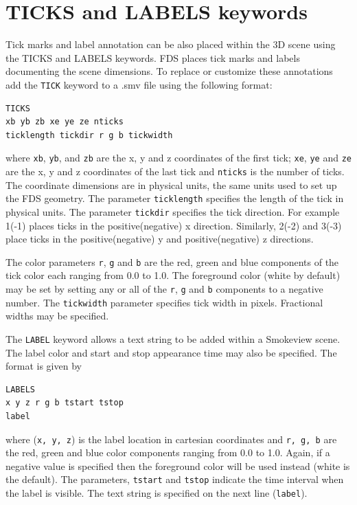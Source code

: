 \documentclass[11pt,twoside]{book}
\begin{document}
\section{TICKS and LABELS keywords}
Tick marks and label annotation
can be also placed within the 3D scene using the TICKS and LABELS keywords.
FDS places tick marks and labels
documenting the scene dimensions.  To replace or customize
these annotations add the {\tt TICK} keyword to a .smv file
using the following format:

\begin{verbatim}
TICKS
xb yb zb xe ye ze nticks
ticklength tickdir r g b tickwidth
\end{verbatim}

\noindent where {\tt xb}, {\tt yb}, and {\tt zb} are the x, y and
z coordinates of the first tick; {\tt xe}, {\tt ye} and {\tt ze}
are the x, y and z coordinates of the last tick and {\tt nticks}
is the number of ticks. The coordinate dimensions are in physical
units, the same units used to set up the FDS geometry. The
parameter {\tt ticklength} specifies the length of the tick in
physical units. The parameter {\tt tickdir} specifies the tick
direction.  For example 1(-1) places ticks in the
positive(negative) x direction. Similarly, 2(-2) and 3(-3) place
ticks in the positive(negative) y and positive(negative) z
directions.

The color parameters {\tt r}, {\tt g} and {\tt b} are the
red, green and blue components of the tick color each
ranging from 0.0 to 1.0. The foreground color (white by
default) may be set by setting any or all of the {\tt r},
{\tt g} and {\tt b} components to a negative number. The
{\tt tickwidth} parameter specifies tick width in pixels.
Fractional widths may be specified.

The {\tt LABEL} keyword allows a text string to be added
within a Smokeview scene.  The label color and start and
stop appearance time may also be specified. The format is
given by

\begin{verbatim}
LABELS
x y z r g b tstart tstop
label
\end{verbatim}

\noindent where ({\tt x, y, z}) is the label location in cartesian
coordinates and {\tt r, g, b} are the red, green and blue color
components ranging from 0.0 to 1.0.  Again, if a negative value is
specified then the foreground color will be used instead (white is
the default).  The parameters, {\tt tstart} and {\tt tstop}
indicate the time interval when the label is visible. The text
string is specified on the next line ({\tt label}).
\end{document}
